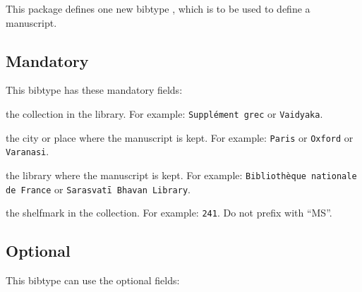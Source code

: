 \documentclass{ltxdockit}[2011/03/25]
\begin{document}
This package defines one new bibtype , which is to be used to define a manuscript.

\subsection{Mandatory}
This bibtype has these mandatory fields:

\begin{fieldlist}

 the collection in the library. For example: 
\verb+Supplément grec+ or \verb+Vaidyaka+.

 the city or place where the manuscript is kept. For 
example: \verb+Paris+ or \verb+Oxford+ or \verb+Varanasi+.

 the library where the manuscript is kept. For example: 
\verb+Bibliothèque nationale de France+ or \verb+Sarasvatī Bhavan Library+.


 the shelfmark in the collection. For example: 
\verb+241+.  Do not prefix with \enquote{MS}.
\end{fieldlist}

\subsection{Optional}
This bibtype can use the optional fields:
\end{document}
